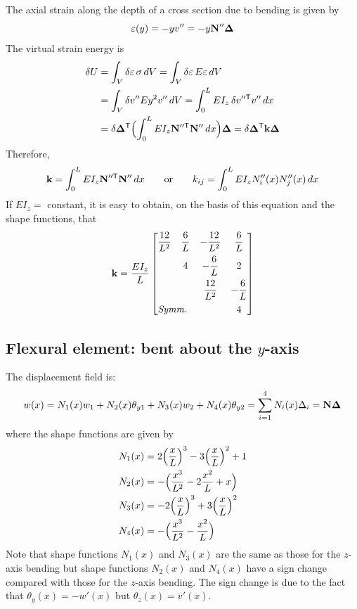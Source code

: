 The axial strain along the depth of a cross section due to bending is given by
\begin{equation}
  \varepsilon(y) = -yv'' = -y\mathbf{N}''\bm{\Delta}
\end{equation}
The virtual strain energy is
\begin{equation}
  \begin{aligned}
    \delta U &= \int_V\delta\varepsilon\,\sigma\,dV = \int_V\delta\varepsilon\,E\varepsilon\,dV\\
        &= \int_V\delta v''Ey^2v''\,dV = \int_0^L EI_z\,\delta v''^{\mathsf{T}}v''\,dx\\
        &= \delta\bm{\Delta}^{\mathsf{T}}\Bigl(\int_0^L EI_z\mathbf{N}''^{\mathsf{T}}\mathbf{N}''\,dx\Bigr)\bm{\Delta} = \delta\bm{\Delta}^{\mathsf{T}}\mathbf{k}\bm{\Delta}
  \end{aligned}
\end{equation}
Therefore,
\begin{equation}
  \mathbf{k} = \int_0^L EI_z\mathbf{N}''^{\mathsf{T}}\mathbf{N}''\,dx\qquad\text{or}\qquad k_{ij} = \int_0^L EI_zN_i''(x)N_j''(x)\,dx
\end{equation}
If $EI_z =$ constant, it is easy to obtain, on the basis of this equation and the shape functions, that
\begin{equation}
  \kmat = \frac{EI_z}{L}
  \begin{bmatrix}
    \dfrac{12}{L^2} & \dfrac6L & -\dfrac{12}{L^2} & \dfrac6L\\[8pt]
    & 4 & -\dfrac6L & 2\\[8pt]
    & & \dfrac{12}{L^2} & -\dfrac6L\\[8pt]
    \multicolumn{2}{l}{\textit{Symm.}} & & 4
  \end{bmatrix}
\end{equation}

\subsection{Flexural element: bent about the \texorpdfstring{$y$}{y}-axis}
The displacement field is:
\begin{equation}
  w(x) = N_1(x)w_1 + N_2(x)\theta_{y1} + N_3(x)w_2 + N_4(x)\theta_{y2} = \sum_{i=1}^4 N_i(x)\Delta_i = \mathbf{N}\bm{\Delta}
\end{equation}
where the shape functions are given by
\begin{align*}
  N_1(x) &= 2\Bigl(\frac xL\Bigr)^3 - 3\Bigl(\frac xL\Bigr)^2 + 1\\
  N_2(x) &= -\Bigl(\frac{x^3}{L^2} - 2\frac{x^2}{L} + x\Bigr)\\
  N_3(x) &= -2\Bigl(\frac xL\Bigr)^3 + 3\Bigl(\frac xL\Bigr)^2\\
  N_4(x) &= -\Bigl(\frac{x^3}{L^2} - \frac{x^2}{L}\Bigr)
\end{align*}
Note that shape functions $N_1(x)$ and $N_3(x)$ are the same as those for the $z$-axis bending but shape functions $N_2(x)$ and $N_4(x)$ have a sign change compared with those for the $z$-axis bending. The sign change is due to the fact that $\theta_y(x) = -w'(x)$ but $\theta_z(x) = v'(x)$.

